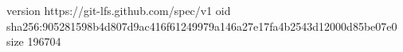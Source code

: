 version https://git-lfs.github.com/spec/v1
oid sha256:905281598b4d807d9ac416f61249979a146a27e17fa4b2543d12000d85be07e0
size 196704
